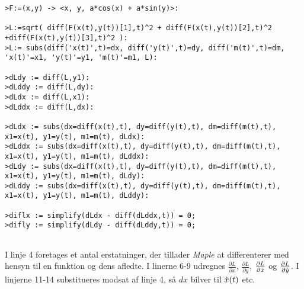 \begin{lstlisting}[caption=Udregning af de to Lagrange ligninger til (\ref{eq:aeggegeo}) med \emph{Maple}  ]
>F:=(x,y) -> <x, y, a*cos(x) + a*sin(y)>:

>L:=sqrt( diff(F(x(t),y(t))[1],t)^2 + diff(F(x(t),y(t))[2],t)^2 +diff(F(x(t),y(t))[3],t)^2 ):
>L:= subs(diff('x(t)',t)=dx, diff('y(t)',t)=dy, diff('m(t)',t)=dm, 'x(t)'=x1, 'y(t)'=y1, 'm(t)'=m1, L):

>dLdy := diff(L,y1):
>dLddy := diff(L,dy):
>dLdx := diff(L,x1):
>dLddx := diff(L,dx):

>dLdx := subs(dx=diff(x(t),t), dy=diff(y(t),t), dm=diff(m(t),t), x1=x(t), y1=y(t), m1=m(t), dLdx):
>dLddx := subs(dx=diff(x(t),t), dy=diff(y(t),t), dm=diff(m(t),t), x1=x(t), y1=y(t), m1=m(t), dLddx):
>dLdy := subs(dx=diff(x(t),t), dy=diff(y(t),t), dm=diff(m(t),t), x1=x(t), y1=y(t), m1=m(t), dLdy):
>dLddy := subs(dx=diff(x(t),t), dy=diff(y(t),t), dm=diff(m(t),t), x1=x(t), y1=y(t), m1=m(t), dLddy):

>diflx := simplify(dLdx - diff(dLddx,t)) = 0;
>difly := simplify(dLdy - diff(dLddy,t)) = 0;


\end{lstlisting}

I linje 4 foretages et antal erstatninger,
der tillader \emph{Maple} at differenterer med hensyn til en funktion og dens afledte.
I linerne 6-9 udregnes \(\frac{\partial L}{\partial x}\), \(\frac{\partial L}{\partial y}\),
 \(\frac{\partial L}{\partial \dot{x}}\) og \(\frac{\partial L}{\partial \dot{y}}\).
I linjerne 11-14 substitueres modsat af linje 4, så \(dx\) bilver til \(\dot{x}(t)\) etc.





